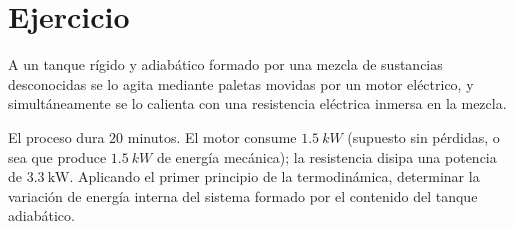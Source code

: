 \section{Ejercicio}\label{ej:Chap04Ejercicio03}
A un tanque rígido y adiabático formado por una mezcla de sustancias desconocidas se lo agita mediante paletas movidas por un motor eléctrico, y simultáneamente se lo calienta con una resistencia eléctrica inmersa en la mezcla.

El proceso dura $20$ minutos. El motor consume $\SI{1.5}{kW}$ (supuesto sin pérdidas, o sea que produce $\SI{1.5}{kW}$ de energía mecánica); la resistencia disipa una potencia de $\SI{3.3}{\kilo\watt}$. Aplicando el primer principio de la termodinámica, determinar la variación de energía interna del sistema formado por el contenido del tanque adiabático.